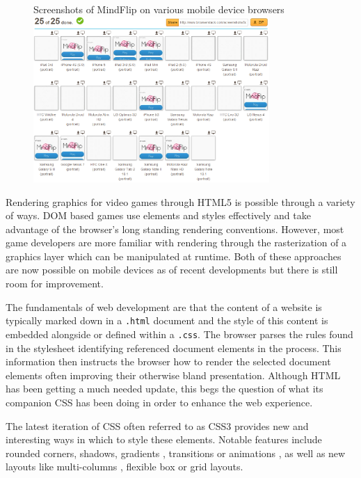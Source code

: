 \documentclass[final]{cmpreport}
\begin{document}
\begin{figure}[h]{Screenshots of MindFlip on various mobile device browsers \label{browserstack}}
  \centering
    \includegraphics[width=0.8\textwidth]{browserstack.png}
\end{figure}

\clearpage
Rendering graphics for video games through HTML5 is possible through a variety of ways. DOM based games use elements and styles effectively and take advantage of the browser's long standing rendering conventions. However, most game developers are more familiar with rendering through the rasterization of a graphics layer which can be manipulated at runtime. Both of these approaches are now possible on mobile devices as of recent developments but there is still room for improvement.

The fundamentals of web development are that the content of a website is typically marked down in a \texttt{.html} document and the style of this content is embedded alongside or defined within a \texttt{.css}. The browser parses the rules found in the stylesheet identifying referenced document elements in the process. This information then instructs the browser how to render the selected document elements often improving their otherwise bland presentation. Although HTML has been getting a much needed update, this begs the question of what its companion CSS has been doing in order to enhance the web experience. 

The latest iteration of CSS often referred to as CSS3 provides new and interesting ways in which to style these elements. Notable features include rounded corners, shadows, gradients , transitions or animations , as well as new layouts like multi-columns , flexible box or grid layouts\footnotemark.

\end{document}
